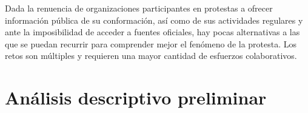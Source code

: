 \documentclass[letterpaper, 11pt]{book}
\theoremstyle{definition}
\theoremstyle{remark}
\begin{document}
Dada la renuencia de organizaciones participantes en protestas a ofrecer información pública de su conformación, así como de sus actividades regulares y ante la imposibilidad de acceder a fuentes oficiales, hay pocas alternativas a las que se puedan recurrir para comprender mejor el fenómeno de la protesta. 
Los retos son múltiples y requieren una mayor cantidad de esfuerzos colaborativos.













\chapter{Análisis descriptivo preliminar}
\label{chap:AnalisisDescriptivo}
\end{document}
